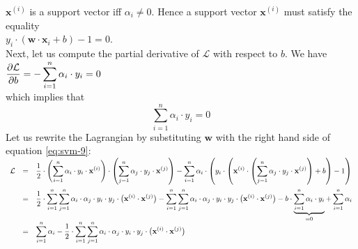 $\mathbf{x}^{(i)}$ is a support vector iff  $\alpha_i \not= 0$.  Hence a support vector $\mathbf{x}^{(i)}$ 
must satisfy the equality
\\[0.2cm]
\hspace*{1.3cm}
$y_i \cdot(\mathbf{w} \cdot \mathbf{x}_i + b) - 1 = 0$.
\\[0.2cm]
Next, let us compute the partial derivative of $\mathcal{L}$ with respect to $b$. We have
\\[0.2cm]
\hspace*{1.3cm}
$\displaystyle \frac{\partial \mathcal{L}}{\partial b} = - \sum\limits_{i=1}^n \alpha_i \cdot y_i = 0$
\\[0.2cm]
which implies that
\begin{equation}
  \label{eq:svm-10}
  \sum\limits_{i=1}^n \alpha_i \cdot y_i = 0  
\end{equation}
Let us rewrite the Lagrangian by substituting $\mathbf{w}$ with the right hand side of equation \ref{eq:svm-9}:
\\[0.2cm]
\hspace*{0.3cm}
$
\begin{array}[t]{lcl}
  \mathcal{L} & = &
                    \displaystyle \frac{1}{2} \cdot \left(\sum\limits_{i=1}^n \alpha_i \cdot y_i \cdot \mathbf{x}^{(i)}\right)
                    \cdot \left(\sum\limits_{j=1}^n \alpha_j \cdot y_j \cdot \mathbf{x}^{(j)}\right) 
               - \sum\limits_{i=1}^n \alpha_i \cdot \left( y_i \cdot\left( \mathbf{x}^{(i)} \cdot
                    \left(\sum\limits_{j=1}^n \alpha_j \cdot y_j \cdot \mathbf{x}^{(j)} \right) + b\right) -1 \right) \\[0.6cm]
              & = &
                    \displaystyle \frac{1}{2} \cdot \sum\limits_{i=1}^n \sum\limits_{j=1}^n \alpha_i \cdot \alpha_j \cdot
                    y_i \cdot y_j \cdot \bigl(\mathbf{x}^{(i)} \cdot \mathbf{x}^{(j)}\bigr) 
                    - \sum\limits_{i=1}^n \sum\limits_{j=1}^n \alpha_i \cdot \alpha_j \cdot y_i \cdot y_j \cdot
                     \bigl( \mathbf{x}^{(i)} \cdot \mathbf{x}^{(j)} \bigr) - b \cdot\underbrace{\sum\limits_{i=1}^n \alpha_i \cdot y_i}_{=0}
                    + \sum\limits_{i=1}^n \alpha_i \\[0.6cm]
              & = & \displaystyle \sum\limits_{i=1}^n \alpha_i - \frac{1}{2} \cdot \sum\limits_{i=1}^n
                    \sum\limits_{j=1}^n \alpha_i \cdot \alpha_j \cdot y_i \cdot y_j \cdot
                    \bigl(\mathbf{x}^{(i)} \cdot \mathbf{x}^{(j)}\bigr)
\end{array}
$
\\[0.2cm]
